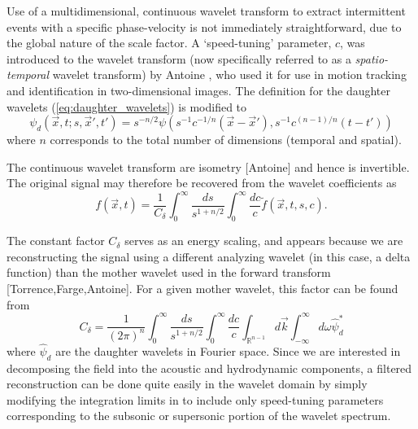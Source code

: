 Use of a multidimensional, continuous wavelet transform to extract intermittent events with a specific phase-velocity is not immediately straightforward, due to the global nature of the scale factor. 
A `speed-tuning' parameter, $c$, was introduced to the wavelet transform (now specifically referred to as a \textit{spatio-temporal} wavelet transform) by Antoine \etal [cite], who used it for use in motion tracking and identification in two-dimensional images. 
The definition for the daughter wavelets (\ref{eq:daughter_wavelets}) is modified to
\begin{equation}
	\psi_d \left( \vec{x}, t;s,\vec{x}', t' \right) = s^{-n/2} \psi \left(s^{-1} c^{-1/n} (\vec{x}-\vec{x}'), s^{-1} c^{(n-1)/n} (t-t') \right)
\end{equation} 
where $n$ corresponds to the total number of dimensions (temporal and spatial).

The continuous wavelet transform are isometry [Antoine] and hence is invertible.
The original signal may therefore be recovered from the wavelet coefficients as 
\begin{equation}
	f(\vec{x},t) = \frac{1}{C_\delta} \int_0^\infty \frac{ds}{s^{1 + n/2}} \int_{0}^{\infty} \frac{dc}{c} \tilde{f} (\vec{x},t,s,c).
	\label{eq:wavelet_filter}
\end{equation}

The constant factor $C_\delta$ serves as an energy scaling, and appears because we are reconstructing the signal using a different analyzing wavelet (in this case, a delta function) than the mother wavelet used in the forward transform [Torrence,Farge,Antoine]. 
For a given mother wavelet, this factor can be found from
\begin{equation}
	C_\delta = \frac{1}{(2 \pi)^n} \int_0^\infty \frac{ds}{s^{1 + n/2}} \int_{0}^{\infty} \frac{dc}{c} \int_{\mathbb{R}^{n-1}} d \vec{k} \int_{-\infty}^{\infty} d\omega \hat{\psi}_d^*
\end{equation}
where $\hat{\psi}_d$ are the daughter wavelets in Fourier space. 
Since we are interested in decomposing the field into the acoustic and hydrodynamic components, a filtered reconstruction can be done quite easily in the wavelet domain by simply modifying the integration limits in  to include only speed-tuning parameters corresponding to the subsonic or supersonic portion of the wavelet spectrum.

